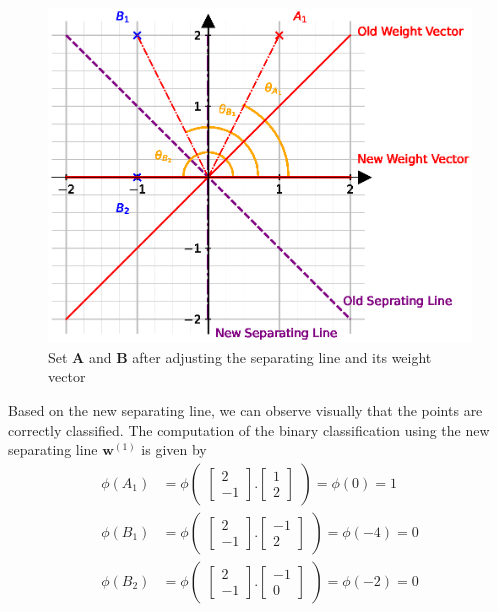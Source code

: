 \begin{figure}[H]
  \centering
  \includegraphics[scale=0.90]{CHAPTER_2/c2_fig_perceptron_example_4_python.eps}
  \caption{Set $\mathbf{A}$ and $\mathbf{B}$ after adjusting the separating line and its weight vector}
  \label{fig:perceptron_example_4}
\end{figure}
\noindent Based on the new separating line, we can observe visually that the points are correctly classified. The computation of the binary classification using the new separating line $\textbf{w}^{(1)}$ is given by
\begin{align*}
  \phi(A_1) &= \phi\begin{pmatrix}
    \begin{bmatrix}
      2\\
      -1
    \end{bmatrix}.\begin{bmatrix}
      1 \\
      2
    \end{bmatrix}
  \end{pmatrix} = \phi(0) = 1 \\
  \phi(B_1) &= \phi\begin{pmatrix}
    \begin{bmatrix}
      2\\
      -1
    \end{bmatrix}.\begin{bmatrix}
      -1 \\
      2
    \end{bmatrix}
  \end{pmatrix} = \phi(-4) = 0 \\
  \phi(B_2) &= \phi\begin{pmatrix}
    \begin{bmatrix}
      2\\
      -1
    \end{bmatrix}.\begin{bmatrix}
      -1 \\
      0
    \end{bmatrix}
  \end{pmatrix} = \phi(-2) = 0
\end{align*}
